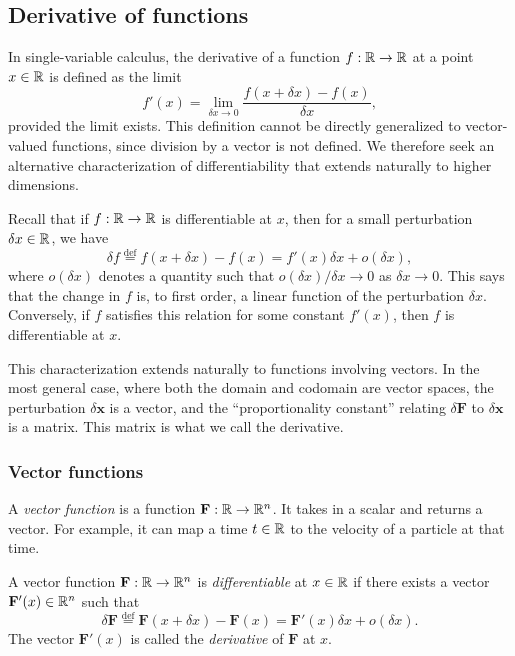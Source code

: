 \documentclass[a4paper]{article}
\begin{document}
\subsection{Derivative of functions}

\begin{rmk}[Motivation]
  In single-variable calculus, the derivative of a function $f: \mathbb{R} \to \mathbb{R}$ at a point $x \in \mathbb{R}$ is defined as the limit
  \[
    f'(x) = \lim_{\delta x \to 0} \frac{f(x + \delta x) - f(x)}{\delta x},
  \]
  provided the limit exists. This definition cannot be directly generalized to vector-valued functions, since division by a vector is not defined. We therefore seek an alternative characterization of differentiability that extends naturally to higher dimensions.

  Recall that if $f: \mathbb{R} \to \mathbb{R}$ is differentiable at $x$, then for a small perturbation $\delta x \in \mathbb{R}$, we have
  \[
    \delta f \stackrel{\text{def}}{=} f(x + \delta x) - f(x) = f'(x) \delta x + o(\delta x),
  \]
  where $o(\delta x)$ denotes a quantity such that $o(\delta x)/\delta x \to 0$ as $\delta x \to 0$. This says that the change in $f$ is, to first order, a linear function of the perturbation $\delta x$. Conversely, if $f$ satisfies this relation for some constant $f'(x)$, then $f$ is differentiable at $x$.

  This characterization extends naturally to functions involving vectors. In the most general case, where both the domain and codomain are vector spaces, the perturbation $\delta \mathbf{x}$ is a vector, and the ``proportionality constant'' relating $\delta \mathbf{F}$ to $\delta \mathbf{x}$ is a matrix. This matrix is what we call the derivative.
\end{rmk}

\subsubsection*{Vector functions }

\begin{defi}
  A \emph{vector function} is a function $\mathbf{F}: \mathbb{R}\to \mathbb{R}^n$. It takes in a scalar and returns a vector. For example, it can map a time $t \in \mathbb{R}$ to the velocity of a particle at that time.
\end{defi}

\begin{defi}
  A vector function $\mathbf{F}: \mathbb{R} \to \mathbb{R}^n$ is \emph{differentiable} at $x \in \mathbb{R}$ if there exists a vector $\mathbf{F}'(x) \in \mathbb{R}^n$ such that
  \[
    \delta \mathbf{F} \stackrel{\text{def}}{=}\mathbf{F}(x + \delta x)- \mathbf{F}(x) = \mathbf{F}'(x)\delta x + o(\delta x).
  \]
  The vector $\mathbf{F}'(x)$ is called the \emph{derivative} of $\mathbf{F}$ at $x$.
\end{defi}
\end{document}
